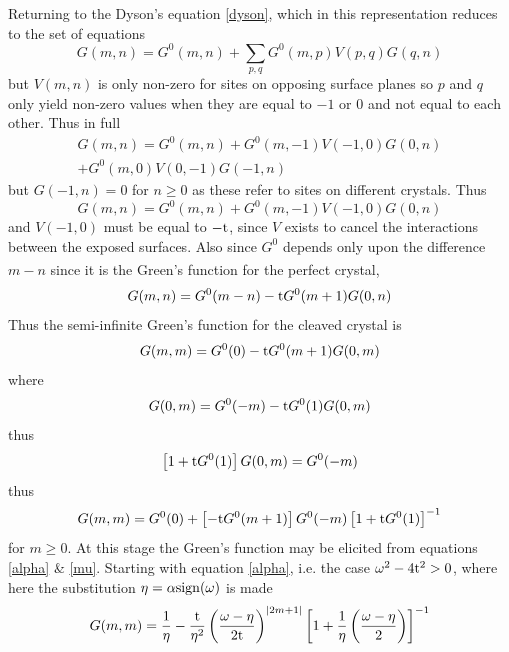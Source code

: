 \documentclass[a4paper, 12pt]{article}
\begin{document}
Returning to the Dyson's equation \eqref{dyson}, which in this representation reduces to the set of equations
\begin{equation}\label{Gsum}
G(m,n)=G^0(m,n)+\sum_{p,q} G^0 (m,p)V(p,q)G(q,n)
\end{equation}
but $V(m,n)$ is only non-zero for sites on opposing surface planes so $p$ and $q$ only yield non-zero values when they are equal to $-1$ or $0$ and not equal to each other. Thus in full
\begin{multline}
G(m,n)=G^0(m,n)+G^0 (m,-1)V(-1,0)G(0,n)\\ +G^0 (m,0)V(0,-1)G(-1,n)
\end{multline} 
but $G(-1,n)=0$ for $n \geq 0 $ as these refer to sites on different crystals. Thus
\begin{equation}\label{GGG}
G(m,n)=G^0(m,n)+G^0 (m,-1)V(-1,0)G(0,n)
\end{equation}
and $V(-1,0)$ must be equal to $-\rm t$, since $V$ exists to cancel the interactions between the exposed surfaces. Also since $G^0$ depends only upon the difference $m-n$ since it is the Green's function for the perfect crystal\textcolor{blue}{\textsuperscript{\cite{KS}}},
\begin{equation}
	G(m,n)=G^0(m-n)-{\rm t} G^0 (m+1)G(0,n)
\end{equation}
Thus the semi-infinite Green's function for the cleaved crystal is
\begin{equation}
	G(m,m)=G^0(0)-{\rm t} G^0 (m+1)G(0,m)
\end{equation}
where
\begin{equation}
	G(0,m)=G^0(-m)-{\rm t} G^0 (1)G(0,m)
\end{equation}
thus
\begin{equation}
	\left[1+ {\rm t}G^0 (1)\right]G(0,m) =G^0 (-m)
\end{equation}
thus
\begin{equation}\label{G}
	G(m,m)=G^0(0)+\left[-{\rm t} G^0 (m+1)\right] G^0(-m)\left[1+ {\rm t}G^0 (1)\right]^{-1}
\end{equation}
\qquad \qquad \qquad for $m \geq 0$.
At this stage the Green's function may be elicited from equations \eqref{alpha} \& \eqref{mu}. Starting with equation \eqref{alpha}, i.e. the case $\omega^2-4{\rm t}^2>0$,  where here the substitution $\eta = \alpha \rm{sign}(\omega)$ is made
\begin{equation}
G(m,m)= \frac{1}{\eta}-\frac{\rm t}{\eta^2}\left(\frac{\omega -\eta}{2\rm t}\right)^{|2m+1|}\left[1+\frac{1}{\eta}\left(\frac{\omega -\eta}{2}\right)\right]^{-1}
\end{equation}
\end{document}
